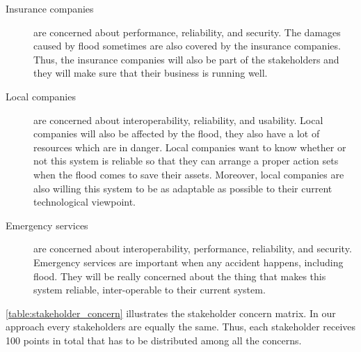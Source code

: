 \begin{description}
\item[Insurance companies] are concerned about performance, reliability, and security. The damages caused by flood sometimes are also covered by the insurance companies. Thus, the insurance companies will also be part of the stakeholders and they will make sure that their business is running well.
\item[Local companies] are concerned about interoperability, reliability, and usability. Local companies will also be affected by the flood, they also have a lot of resources which are in danger. Local companies want to know whether or not this system is reliable so that they can arrange a proper action sets when the flood comes to save their assets. Moreover, local companies are also willing this system to be as adaptable as possible to their current technological viewpoint.
\item[Emergency services] are concerned about interoperability, performance, reliability, and security. Emergency services are important when any accident happens, including flood. They will be really concerned about the thing that makes this system reliable, inter-operable to their current system.
\end{description}

\autoref{table:stakeholder_concern} illustrates the stakeholder concern matrix. In our approach every stakeholders are equally the same. Thus, each stakeholder receives 100 points in total that has to be distributed among all the concerns.

